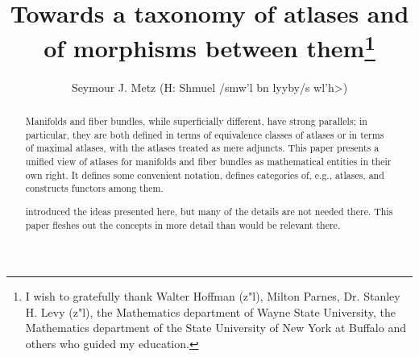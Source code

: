 \documentclass{article}
\begin{document}

\title%
{%
  Towards a taxonomy of atlases and of morphisms between them\thanks%
  {
  I wish to gratefully thank Walter Hoffman (z"l),
  Milton Parnes, Dr. Stanley H. Levy (z"l), the Mathematics department of
  Wayne State University, the Mathematics department of the State
  University of New York at Buffalo and others who guided my education.
  }
}
\author{Seymour J. Metz (H: Shmuel \</smw'l bn lyyby/s wl'h>)
}
\maketitle




\begin{abstract}
Manifolds and fiber bundles, while superficially different, have strong
parallels; in particular, they are both defined in terms of equivalence
classes of atlases or in terms of maximal atlases, with the atlases
treated as mere adjuncts.  This paper presents a unified view of atlases
for manifolds and fiber bundles as mathematical entities in their own
right. It defines some convenient notation, defines categories of, e.g.,
atlases, and constructs functors among them.

\cite{LCS} introduced the ideas presented here, but many of the details
are not needed there.  This paper fleshes out the concepts in more
detail than would be relevant there.
\end{abstract}

\setupset   {}
\end{document}

